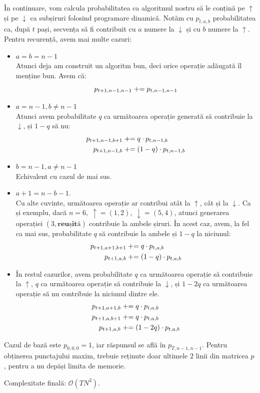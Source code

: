 În continuare, vom calcula probabilitatea ca algoritmul nostru să le conțină pe $\uparrow$ și pe $\downarrow$ ca subșiruri folosind programare dinamică. Notăm cu $p_{t,a,b}$
probabilitatea ca, după $t$ pași, secvența să fi contribuit
cu $a$ numere la $\downarrow$ și cu $b$ numere la $\uparrow$. Pentru recurență, avem mai multe cazuri:

\begin{itemize}
    \item $a = b = n - 1$ \\
	Atunci deja am construit un algoritm bun, deci orice operație adăugată îl menține bun. Avem că:
    \[
	p_{t + 1, n - 1, n - 1} \mathrel{+\mkern-5mu=} p_{t, n - 1, n - 1}
    \]
\item $a = n - 1, b \neq n - 1$\\
    Atunci avem probabilitate $q$ ca următoarea operație generată să contribuie la $\downarrow$, și $1 - q$ să nu:
    \begin{align*}
	p_{t + 1, n - 1, b + 1} & \mathrel{+\mkern-5mu=} q \cdot p_{t, n - 1, b} \\
	p_{t + 1, n - 1, b} & \mathrel{+\mkern-5mu=} (1 - q) \cdot p_{t, n - 1, b}
    \end{align*}
\item $b = n - 1, a \neq n - 1$ \\
    Echivalent cu cazul de mai sus.
\item $a + 1 = n - b - 1$. \\
    Cu alte cuvinte, următoarea operație ar contribui atât la $\uparrow$, cât și la $\downarrow$. Ca și exemplu, dacă $n = 6, \; \uparrow = (1, 2), \; \downarrow = (5, 4)$, atunci generarea operației $(3, \textbf{reușită})$ contribuie la ambele șiruri. În acest caz, avem, la fel ca mai sus, probabilitate $q$ să contribuie la ambele și $1 - q$ la niciunul:
    \begin{align*}
	p_{t + 1, a + 1, b + 1} & \mathrel{+\mkern-5mu=} q \cdot p_{t, a, b} \\
	p_{t + 1, a, b} & \mathrel{+\mkern-5mu=} (1 - q) \cdot p_{t, a, b}
    \end{align*}
\item În restul cazurilor, avem probabilitate $q$ ca următoarea operație să contribuie la $\uparrow$, $q$ ca următoarea operație să contribuie la $\downarrow$, și $1 - 2q$ ca următoarea operație să nu contribuie la niciunul dintre ele.
    \begin{align*}
	p_{t + 1, a + 1, b} & \mathrel{+\mkern-5mu=} q \cdot p_{t, a, b} \\
	p_{t + 1, a, b + 1} & \mathrel{+\mkern-5mu=} q \cdot p_{t, a, b} \\
	p_{t + 1, a, b} & \mathrel{+\mkern-5mu=} (1 - 2q) \cdot p_{t, a, b}
    \end{align*}
\end{itemize}

Cazul de bază este $p_{0, 0, 0} = 1$, iar răspunsul se află în $p_{T, n - 1, n - 1}$. Pentru obținerea punctajului maxim, trebuie reținute doar ultimele $2$ linii din matricea $p$, pentru a nu depăși limita de memorie.

\medskip

Complexitate finală: $\mathcal{O}(TN^{2})$.
